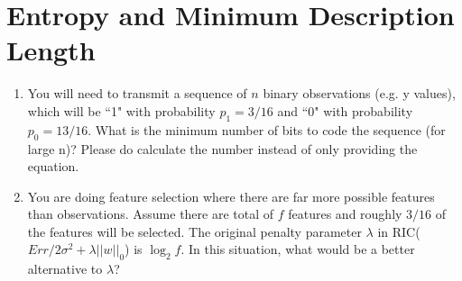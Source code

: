 \section{Entropy and Minimum Description Length}


\begin{enumerate}

\item  You will need to transmit a sequence of $n$ binary observations (e.g. y values),
which will be ``1" with probability $p_1 = 3/16$ and ``0" with probability $p_0 =13/16$.
What is the minimum number of bits to code the sequence (for large n)? Please do calculate the number instead of only providing the equation.


\item  You are doing feature selection where there are far more possible features than observations. Assume there are total of $f$ features and
 roughly $3/16$ of the features will be selected. The original penalty parameter $\lambda$ in RIC($Err/2\sigma^2 + \lambda ||w||_0$) is $\log_2 f$. In this situation, what would be a better alternative to $\lambda$?


\end{enumerate}


